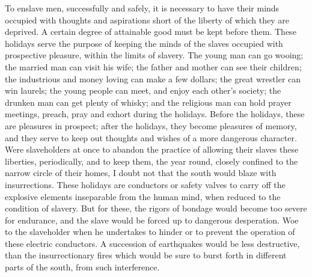 To enslave men, successfully and safely, it is necessary to have their
minds occupied with thoughts and aspirations short of the liberty of
which they are deprived. A certain degree of attainable good must be
kept before them. These holidays serve the purpose of keeping the minds
of the slaves occupied with prospective pleasure, within the limits of
slavery. The young man can go wooing; the married man can visit his
wife; the father and mother can see their children; the industrious and
money loving can make a few dollars; the great wrestler can win laurels;
the young people can meet, and enjoy each other's society; the drunken
man can get plenty of whisky; {\protect\hypertarget{254}{}{}}and the
religious man can hold prayer meetings, preach, pray and exhort during
the holidays. Before the holidays, these are pleasures in prospect;
after the holidays, they become pleasures of memory, and they serve to
keep out thoughts and wishes of a more dangerous character. Were
slaveholders at once to abandon the practice of allowing their slaves
these liberties, periodically, and to keep them, the year round, closely
confined to the narrow circle of their homes, I doubt not that the south
would blaze with insurrections. These holidays are conductors or safety
valves to carry off the explosive elements inseparable from the human
mind, when reduced to the condition of slavery. But for these, the
rigors of bondage would become too severe for endurance, and the slave
would be forced up to dangerous desperation. Woe to the slaveholder when
he undertakes to hinder or to prevent the operation of these electric
conductors. A succession of earthquakes would be less destructive, than
the insurrectionary fires which would be sure to burst forth in
different parts of the south, from such interference.


